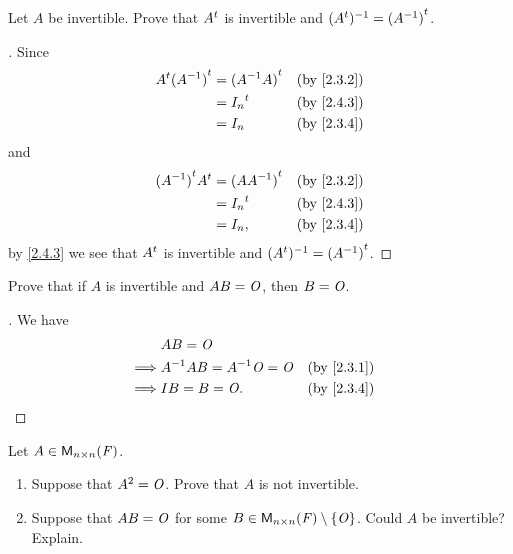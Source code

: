\begin{ex}\label{ex:2.4.5}
  Let \(A\) be invertible.
  Prove that \({A}^{t}\) is invertible and \(({A}^{t})^{-1} = {(A^{-1})}^{t}\).
\end{ex}

\begin{proof}[]
  Since
  \begin{align*}
    \tp{A} \tp{(A^{-1})} & = \tp{(A^{-1} A)} &  & \text{(by \cref{2.3.2})} \\
                         & = \tp{I_n}        &  & \text{(by \cref{2.4.3})} \\
                         & = I_n             &  & \text{(by \cref{2.3.4})}
  \end{align*}
  and
  \begin{align*}
    \tp{(A^{-1})} \tp{A} & = \tp{(A A^{-1})} &  & \text{(by \cref{2.3.2})} \\
                         & = \tp{I_n}        &  & \text{(by \cref{2.4.3})} \\
                         & = I_n,            &  & \text{(by \cref{2.3.4})}
  \end{align*}
  by \cref{2.4.3} we see that \({A}^{t}\) is invertible and \(({A}^{t})^{-1} = {(A^{-1})}^{t}\).
\end{proof}

\begin{ex}\label{ex:2.4.6}
  Prove that if \(A\) is invertible and \(AB = \mathit{O}\), then \(B = \mathit{O}\).
\end{ex}

\begin{proof}[]
  We have
  \begin{align*}
             & AB = \zm                                                   \\
    \implies & A^{-1} AB = A^{-1} \zm = \zm &  & \text{(by \cref{2.3.1})} \\
    \implies & IB = B = \zm.                &  & \text{(by \cref{2.3.4})}
  \end{align*}
\end{proof}

\begin{ex}\label{ex:2.4.7}
  Let \(A \in \mathsf{M}_{{n} \times n}({\mathit{F}})\).
  \begin{enumerate}
    \item Suppose that \(A^2 = \mathit{O}\).
          Prove that \(A\) is not invertible.
    \item Suppose that \(AB = \mathit{O}\) for some \(B \in \mathsf{M}_{{n} \times n}({\mathit{F}}) \setminus \left\lbrace\mathit{O}\right\rbrace\).
          Could \(A\) be invertible?
          Explain.
  \end{enumerate}
\end{ex}

